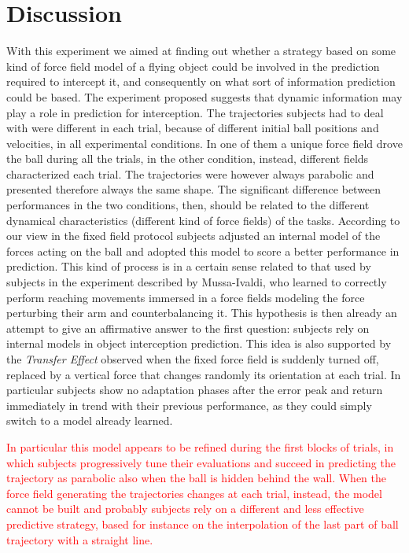 \section{Discussion} \label{Discussion}

With this experiment we aimed at finding out whether a strategy based on some kind of force field model of a flying object could be involved in the prediction required to intercept it, and consequently on what sort of information prediction could be based.
The experiment proposed suggests that dynamic information may play a role in prediction for interception. The trajectories subjects had to deal with were different in each trial, because of different initial ball positions and velocities, in all experimental conditions. In one of them a unique force field drove the ball during all the trials, in the other condition, instead, different fields characterized each trial. The trajectories were however always parabolic and presented therefore always the same shape. The significant difference between performances in the two conditions, then, should be related to the different dynamical characteristics (different kind of force fields) of the tasks. According to our view in the fixed field protocol subjects adjusted an internal model of the forces acting on the ball and adopted this model to score a better performance in prediction.
This kind of process is in a certain sense related to that used by subjects in the experiment described by Mussa-Ivaldi, who learned to correctly perform reaching movements immersed in a force fields modeling the force perturbing their arm and counterbalancing it. This hypothesis is then already an attempt to give an affirmative answer to the first question: subjects rely on internal models in object interception prediction.
This idea is also supported by the \textit{Transfer Effect} observed when the fixed force field is suddenly turned off, replaced by a vertical force that changes randomly its orientation at each trial. In particular subjects show no adaptation phases after the error peak and return immediately in trend with their previous performance, as they could simply switch to a model already learned.

\textcolor{red}{In particular this model appears to be refined during the first blocks of trials, in which subjects progressively tune their evaluations and succeed in predicting the trajectory as parabolic also when the ball is hidden behind the wall. When the force field generating the trajectories changes at each trial, instead, the model cannot be built and probably subjects rely on a different and less effective predictive strategy, based for instance on the interpolation of the last part of ball trajectory with a straight line.}

